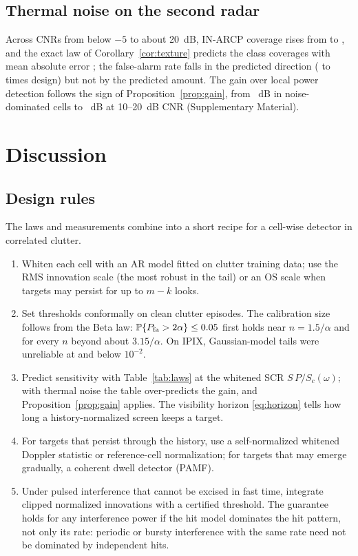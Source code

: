 \documentclass[journal]{IEEEtran}
\newcommand{\PP}{\mathbb{P}}
\begin{document}
\subsection{Thermal noise on the second radar}\label{sec:jku}
Across CNRs from below $-5$ to about 20~dB, IN-ARCP coverage rises from \JInLow{} to \JInHigh, and the exact law of Corollary~\ref{cor:texture} predicts the class coverages with mean absolute error \JMae; the false-alarm rate falls in the predicted direction (\JPfaRatioLow{} to \JPfaRatioHigh{} times design) but not by the predicted amount. The gain over local power detection follows the sign of Proposition~\ref{prop:gain}, from \JINGainLow~dB in noise-dominated cells to \JINGainHigh~dB at 10--20~dB CNR (Supplementary Material).

\section{Discussion}
\subsection{Design rules}
The laws and measurements combine into a short recipe for a cell-wise detector in correlated clutter.
\begin{enumerate}[leftmargin=*,itemsep=1pt]
\item Whiten each cell with an AR model fitted on clutter training data; use the RMS innovation scale (the most robust in the tail) or an OS scale when targets may persist for up to $m-k$ looks.
\item Set thresholds conformally on clean clutter episodes. The calibration size follows from the Beta law: $\PP\{P_{\rm fa}>2\alpha\}\le0.05$ first holds near $n=1.5/\alpha$ and for every $n$ beyond about $3.15/\alpha$. On IPIX, Gaussian-model tails were unreliable at and below $10^{-2}$.
\item Predict sensitivity with Table~\ref{tab:laws} at the whitened SCR $S\,P/S_c(\omega)$; with thermal noise the table over-predicts the gain, and Proposition~\ref{prop:gain} applies. The visibility horizon \eqref{eq:horizon} tells how long a history-normalized screen keeps a target.
\item For targets that persist through the history, use a self-normalized whitened Doppler statistic or reference-cell normalization; for targets that may emerge gradually, a coherent dwell detector (PAMF).
\item Under pulsed interference that cannot be excised in fast time, integrate clipped normalized innovations with a certified threshold. The guarantee holds for any interference power if the hit model dominates the hit pattern, not only its rate: periodic or bursty interference with the same rate need not be dominated by independent hits.
\end{enumerate}
\end{document}

